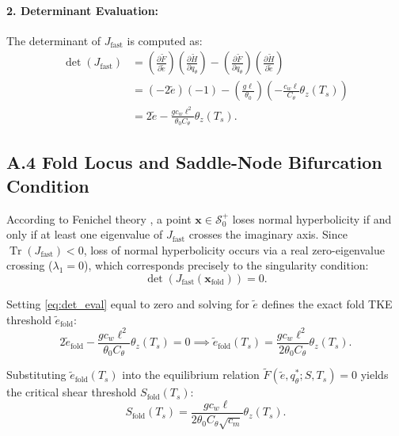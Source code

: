 \paragraph{2. Determinant Evaluation:}
The determinant of $J_{\mathrm{fast}}$ is computed as:
\begin{align}
\det(J_{\mathrm{fast}}) &= \left(\frac{\partial \tilde{F}}{\partial \tilde e}\right)\left(\frac{\partial \tilde{H}}{\partial q_\theta}\right) - \left(\frac{\partial \tilde{F}}{\partial q_\theta}\right)\left(\frac{\partial \tilde{H}}{\partial \tilde e}\right) \nonumber \\[4pt]
&= (-2\tilde e)(-1) - \left(\frac{g \ell}{\theta_0}\right)\left(-\frac{c_w \ell}{C_\theta} \theta_z(T_s)\right) \nonumber \\[4pt]
&= 2\tilde e - \frac{g c_w \ell^2}{\theta_0 C_\theta} \theta_z(T_s).
\label{eq:det_eval}
\end{align}

\subsection*{A.4 Fold Locus and Saddle-Node Bifurcation Condition}

According to Fenichel theory \citep{Fenichel1979}, a point $\mathbf{x} \in \mathcal{S}_0^+$ loses normal hyperbolicity if and only if at least one eigenvalue of $J_{\mathrm{fast}}$ crosses the imaginary axis. Since $\operatorname{Tr}(J_{\mathrm{fast}}) < 0$, loss of normal hyperbolicity occurs via a real zero-eigenvalue crossing ($\lambda_1 = 0$), which corresponds precisely to the singularity condition:
\begin{equation}
\det\left(J_{\mathrm{fast}}(\mathbf{x}_{\mathrm{fold}})\right) = 0.
\label{eq:singularity_cond}
\end{equation}

Setting \eqref{eq:det_eval} equal to zero and solving for $\tilde e$ defines the exact fold TKE threshold $\tilde e_{\mathrm{fold}}$:
\begin{equation}
2\tilde e_{\mathrm{fold}} - \frac{g c_w \ell^2}{\theta_0 C_\theta} \theta_z(T_s) = 0 \implies \tilde e_{\mathrm{fold}}(T_s) = \frac{g c_w \ell^2}{2 \theta_0 C_\theta} \theta_z(T_s).
\label{eq:e_fold_derived}
\end{equation}

Substituting $\tilde e_{\mathrm{fold}}(T_s)$ into the equilibrium relation $\tilde{F}(\tilde e, q_\theta^*; S, T_s) = 0$ yields the critical shear threshold $S_{\mathrm{fold}}(T_s)$:
\begin{equation}
S_{\mathrm{fold}}(T_s) = \frac{g c_w \ell}{2 \theta_0 C_\theta \sqrt{c_m}} \theta_z(T_s).
\label{eq:S_fold_derived}
\end{equation}

